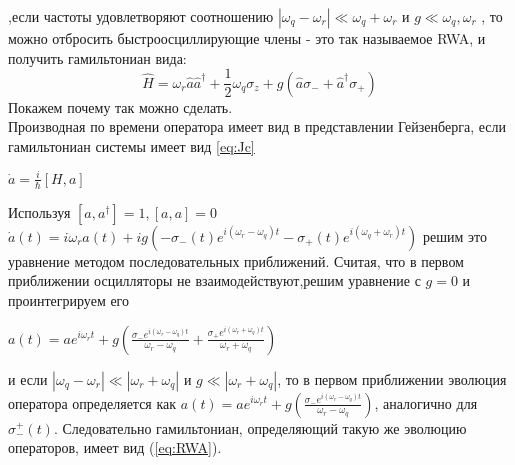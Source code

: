 \documentclass[12pt, twoside]{report}
\begin{document}
,если частоты удовлетворяют соотношению $|\omega_q-\omega_r| \ll \omega_q + \omega_r$ и $g \ll \omega_q,\omega_r$
, то можно отбросить быстроосциллирующие члены - это так называемое RWA, и получить гамильтониан вида:
\begin{equation}
\hat{H}=\omega_r\hat{a}\hat{a}^{\dagger}+\frac{1}{2}\omega_q\sigma_z+
g(\hat{a}\sigma_-+\hat{a}^{\dagger}\sigma_+)
\label{eq:RWA}
\end{equation}
Покажем почему так можно сделать.\\
Производная по времени оператора имеет вид в представлении
Гейзенберга, если гамильтониан системы имеет вид \ref{eq:Jc}
\begin{center}
$
\dot{a}=\frac{i}{\hbar}[H,a]
$
\end{center}
Используя $[a,a^{\dagger}]=1,[a,a]=0$ \\
$\dot{a}(t)=i\omega_r a(t) +ig(-\sigma_ -(t) e^{i(\omega_r-\omega_q)t} - \sigma_+(t)e^{i(\omega_q+\omega_r)t})$
решим это уравнение методом последовательных приближений. Считая, что в первом приближении осцилляторы не взаимодействуют,решим уравнение с $g=0$ и проинтегрируем его
\begin{center}
$a(t)=ae^{i\omega_rt}+g(\frac{\sigma_-e^{i(\omega_r-\omega_q)t}}{\omega_r-\omega_q}+\frac{\sigma_+e^{i(\omega_r+\omega_q)t}}{\omega_r+\omega_q})$
\end{center}
и если $|\omega_q-\omega_r| \ll |\omega_r+\omega_q|$ и
$g \ll |\omega_r+\omega_q|$, то в первом приближении
эволюция оператора  определяется как 
$a(t)=ae^{i\omega_rt}+g(\frac{\sigma_-e^{i(\omega_r-\omega_q)t}}{\omega_r-\omega_q})$, аналогично для $\sigma_-^+(t)$.
Следовательно гамильтониан, определяющий такую же эволюцию операторов, имеет вид (\ref{eq:RWA}).
\end{document}
